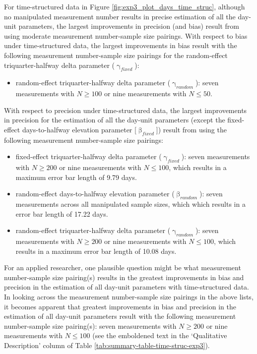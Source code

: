 \documentclass[
12pt, %
twoside,
english]{guelphthesis}
\begin{document}
For time-structured data in Figure \ref{fig:exp3_plot_days_time_struc}, although no manipulated measurement number results in precise estimation of all the day-unit parameters, the largest improvements in precision (and bias) result from using moderate measurement number-sample size pairings. With respect to bias under time-structured data, the largest improvements in bias result with the following measurement number-sample size pairings for the random-effect triquarter-halfway delta parameter (\(\upgamma_{fixed}\)):
\begin{itemize}
\tightlist
\item
  random-effect triquarter-halfway delta parameter (\(\upgamma_{random}\)): seven measurements with \(N \ge 100\) or nine measurements with \(N \le 50\).
\end{itemize}
\noindent With respect to precision under time-structured data, the largest improvements in precision for the estimation of all the day-unit parameters (except the fixed-effect days-to-halfway elevation parameter {[}\(\upbeta_{fixed}\){]}) result from using the following measurement number-sample size pairings:
\begin{itemize}
\tightlist
\item
  fixed-effect triquarter-halfway delta parameter (\(\upgamma_{fixed}\)): seven measurements with \(N \ge 200\) or nine measurements with \(N \le 100\), which results in a maximum error bar length of 9.79 days.
\item
  random-effect days-to-halfway elevation parameter (\(\upbeta_{random}\)): seven measurements across all manipulated sample sizes, which which results in a error bar length of 17.22 days.
\item
  random-effect triquarter-halfway delta parameter (\(\upgamma_{random}\)): seven measurements with \(N \ge 200\) or nine measurements with \(N \le 100\), which results in a maximum error bar length of 10.08 days.
\end{itemize}
For an applied researcher, one plausible question might be what measurement number-sample size pairing(s) results in the greatest improvements in bias and precision in the estimation of all day-unit parameters with time-structured data. In looking across the measurement number-sample size pairings in the above lists, it becomes apparent that greatest improvements in bias and precision in the estimation of all day-unit parameters result with the following measurement number-sample size pairing(s): seven measurements with \(N \ge 200\) or nine measurements with \(N \le 100\) (see the emboldened text in the `Qualitative Description' column of Table \ref{tab:summary-table-time-struc-exp3}).
\end{document}
